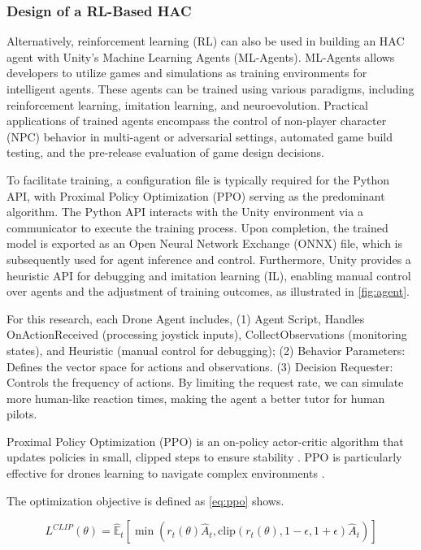 \subsubsection{Design of a RL-Based HAC}

Alternatively, reinforcement learning (RL) can also be used in building an HAC agent with Unity's Machine Learning Agents (ML-Agents). ML-Agents allows developers to utilize games and simulations as training environments for intelligent agents. These agents can be trained using various paradigms, including reinforcement learning, imitation learning, and neuroevolution. Practical applications of trained agents encompass the control of non-player character (NPC) behavior in multi-agent or adversarial settings, automated game build testing, and the pre-release evaluation of game design decisions.

To facilitate training, a configuration file is typically required for the Python API, with Proximal Policy Optimization (PPO) serving as the predominant algorithm. The Python API interacts with the Unity environment via a communicator to execute the training process. Upon completion, the trained model is exported as an Open Neural Network Exchange (ONNX) file, which is subsequently used for agent inference and control. Furthermore, Unity provides a heuristic API for debugging and imitation learning (IL), enabling manual control over agents and the adjustment of training outcomes, as illustrated in \cref{fig:agent}.



For this research, each Drone Agent includes, (1) Agent Script, Handles OnActionReceived (processing joystick inputs), CollectObservations (monitoring states), and Heuristic (manual control for debugging); (2) Behavior Parameters: Defines the vector space for actions and observations. (3) Decision Requester: Controls the frequency of actions. By limiting the request rate, we can simulate more human-like reaction times, making the agent a better tutor for human pilots.

Proximal Policy Optimization (PPO) is an on-policy actor-critic algorithm that updates policies in small, clipped steps to ensure stability \parencite{openai2017ppo}. PPO is particularly effective for drones learning to navigate complex environments \parencite{yu2025depth}.

The optimization objective is defined as \cref{eq:ppo} shows.

\begin{equation}\label{eq:ppo}
L^{CLIP}(\theta) = \hat{\mathbb{E}}_t [ \min(r_t(\theta)\hat{A}_t, \text{clip}(r_t(\theta), 1-\epsilon, 1+\epsilon)\hat{A}_t) ]
\end{equation}

